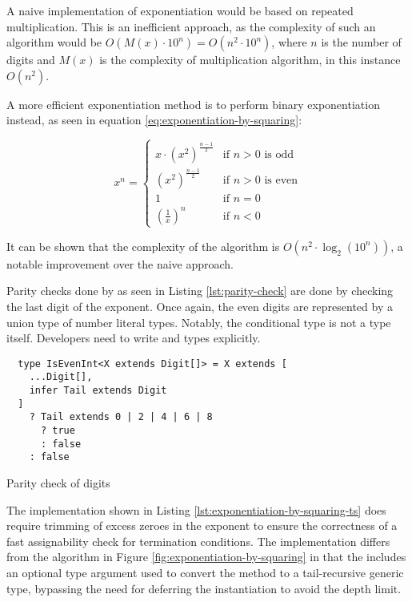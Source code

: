 A naive implementation of exponentiation would be based on repeated multiplication. This is an inefficient approach, as the complexity of such an algorithm would be $O(M(x) \cdot 10^n) = O(n^2 \cdot 10^n)$, where $n$ is the number of digits and $M(x)$ is the complexity of multiplication algorithm, in this instance $O(n^2)$.

A more efficient exponentiation method is to perform binary exponentiation instead, as seen in equation \ref{eq:exponentiation-by-squaring}:

\begin{equation}\label{eq:exponentiation-by-squaring}
  x^n =
  \begin{cases}
    x \cdot (x^2)^\frac{n-1}{2} & \text{if } n > 0 \text{ is odd}  \\
    (x^2)^\frac{n-1}{2}         & \text{if } n > 0 \text{ is even} \\
    1                           & \text{if } n = 0                 \\
    (\frac{1}{x})^n             & \text{if } n < 0
  \end{cases}
\end{equation}

It can be shown that the complexity of the algorithm is $O(n^2 \cdot \log_2(10^n))$, a notable improvement over the naive approach.

Parity checks done by  as seen in Listing \ref{lst:parity-check} are done by checking the last digit of the exponent. Once again, the even digits are represented by a union type of number literal types. Notably, the conditional type is not a type itself. Developers need to write  and  types explicitly.

\begin{listing}[ht]
  \begin{verbatim}
  type IsEvenInt<X extends Digit[]> = X extends [
    ...Digit[],
    infer Tail extends Digit
  ]
    ? Tail extends 0 | 2 | 4 | 6 | 8
      ? true
      : false
    : false
  \end{verbatim}
  \caption{Parity check of digits}\label{lst:parity-check}
\end{listing}

The implementation shown in Listing \ref{lst:exponentiation-by-squaring-ts} does require trimming of excess zeroes in the exponent to ensure the correctness of a fast assignability check for termination conditions. The implementation differs from the algorithm in Figure \ref{fig:exponentiation-by-squaring} in that the  includes an optional type argument  used to convert the method to a tail-recursive generic type, bypassing the need for deferring the instantiation to avoid the depth limit.

